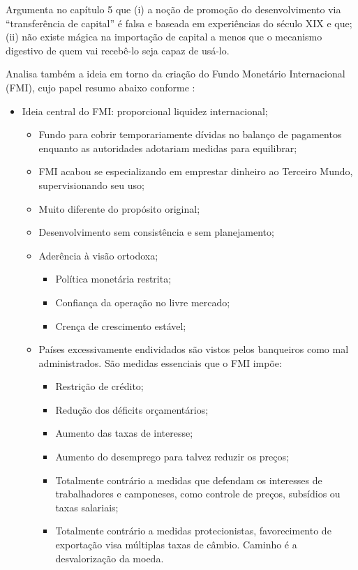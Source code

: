 	 Argumenta no capítulo 5 que (i) a noção de promoção do desenvolvimento via ``transferência de capital'' é falsa e baseada em experiências do século XIX e que; (ii) não existe mágica na importação de capital a menos que o mecanismo digestivo de quem vai recebê-lo seja capaz de usá-lo.
	
	Analisa também a ideia em torno da criação do Fundo Monetário Internacional (FMI), cujo papel resumo abaixo conforme :
	
	\begin{itemize}
		\item Ideia central do FMI: proporcional liquidez internacional;
			\begin{itemize}
				\item Fundo para cobrir temporariamente dívidas no balanço de pagamentos enquanto as autoridades adotariam medidas para equilibrar;
				\item FMI acabou se especializando em emprestar dinheiro ao Terceiro Mundo, supervisionando seu uso;
				\item Muito diferente do propósito original;
				\item Desenvolvimento sem consistência e sem planejamento;
				\item Aderência à visão ortodoxa;
					\begin{itemize}
						\item Política monetária restrita;
						\item Confiança da operação no livre mercado;
						\item Crença de crescimento estável;
					\end{itemize}
				\item Países excessivamente endividados são vistos pelos banqueiros como mal administrados. São medidas essenciais que o FMI impõe:
					\begin{itemize}
							\item Restrição de crédito;
							\item Redução dos déficits orçamentários;
							\item Aumento das taxas de interesse;
							\item Aumento do desemprego para talvez reduzir os preços;
							\item Totalmente contrário a medidas que defendam os interesses de trabalhadores e camponeses, como controle de preços, subsídios ou taxas salariais;	\item Totalmente contrário a medidas protecionistas, favorecimento de exportação visa múltiplas taxas de câmbio. Caminho é a desvalorização da moeda.
					\end{itemize}
			\end{itemize}
	\end{itemize}
	
